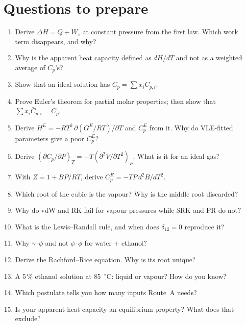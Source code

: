 \documentclass[11pt,a4paper]{article}
\begin{document}
\section{Questions to prepare}
\begin{enumerate}
\item Derive $\Delta H=Q+W_s$ at constant pressure from the first law. Which work term disappears, and why?
\item Why is the apparent heat capacity defined as $dH/dT$ and not as a weighted average of $C_p$'s?
\item Show that an ideal solution has $C_p=\sum x_iC_{p,i}$.
\item Prove Euler's theorem for partial molar properties; then show that $\sum x_i\bar C_{p,i}=C_p$.
\item Derive $H^E=-RT^2\,\partial(G^E/RT)/\partial T$ and $C_p^E$ from it. Why do VLE-fitted parameters give a
poor $C_p^E$?
\item Derive $(\partial C_p/\partial P)_T=-T(\partial^2V/\partial T^2)_P$. What is it for an ideal gas?
\item With $Z=1+BP/RT$, derive $C_p^R=-TP\,d^2B/dT^2$.
\item Which root of the cubic is the vapour? Why is the middle root discarded?
\item Why do vdW and RK fail for vapour pressures while SRK and PR do not?
\item What is the Lewis--Randall rule, and when does $\delta_{12}=0$ reproduce it?
\item Why $\gamma$--$\phi$ and not $\phi$--$\phi$ for water + ethanol?
\item Derive the Rachford--Rice equation. Why is its root unique?
\item A 5\,\% ethanol solution at 85~$^\circ$C: liquid or vapour? How do you know?
\item Which postulate tells you how many inputs Route~A needs?
\item Is your apparent heat capacity an equilibrium property? What does that exclude?
\end{enumerate}
\end{document}
